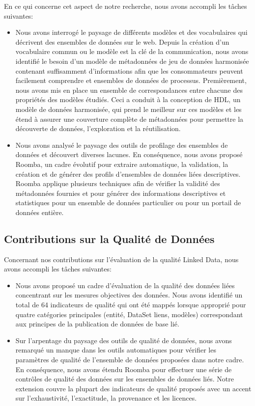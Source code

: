 \documentclass[a4paper,11pt,twoside]{ThesisStyle}
\begin{document}
En ce qui concerne cet aspect de notre recherche, nous avons accompli les tâches suivantes:
\begin{itemize}
	\item Nous avons interrogé le paysage de différents modèles et des vocabulaires qui décrivent des ensembles de données sur le web. Depuis la création d'un vocabulaire commun ou le modèle est la clé de la communication, nous avons identifié le besoin d'un modèle de métadonnées de jeu de données harmonisée contenant suffisamment d'informations afin que les consommateurs peuvent facilement comprendre et ensembles de données de processus. Premièrement, nous avons mis en place un ensemble de correspondances entre chacune des propriétés des modèles étudiés. Ceci a conduit à la conception de HDL, un modèle de données harmonisée, qui prend le meilleur sur ces modèles et les étend à assurer une couverture complète de métadonnées pour permettre la découverte de données, l'exploration et la réutilisation.
	\item Nous avons analysé le paysage des outils de profilage des ensembles de données et découvert diverses lacunes. En conséquence, nous avons proposé Roomba, un cadre évolutif pour extraire automatique, la validation, la création et de générer des profils d'ensembles de données liées descriptives. Roomba applique plusieurs techniques afin de vérifier la validité des métadonnées fournies et pour générer des informations descriptives et statistiques pour un ensemble de données particulier ou pour un portail de données entière.
\end{itemize}

\subsection{Contributions sur la Qualité de Données}
Concernant nos contributions sur l'évaluation de la qualité Linked Data, nous avons accompli les tâches suivantes:
\begin{itemize}
	\item Nous avons proposé un cadre d'évaluation de la qualité des données liées concentrant sur les mesures objectives des données. Nous avons identifié un total de 64 indicateurs de qualité qui ont été mappés lorsque approprié pour quatre catégories principales (entité, DataSet liens, modèles) correspondant aux principes de la publication de données de base lié.
	\item Sur l'arpentage du paysage des outils de qualité de données, nous avons remarqué un manque dans les outils automatiques pour vérifier les paramètres de qualité de l'ensemble de données proposées dans notre cadre. En conséquence, nous avons étendu Roomba pour effectuer une série de contrôles de qualité des données sur les ensembles de données liés. Notre extension couvre la plupart des indicateurs de qualité proposés avec un accent sur l'exhaustivité, l'exactitude, la provenance et les licences.
\end{itemize}
\end{document}
